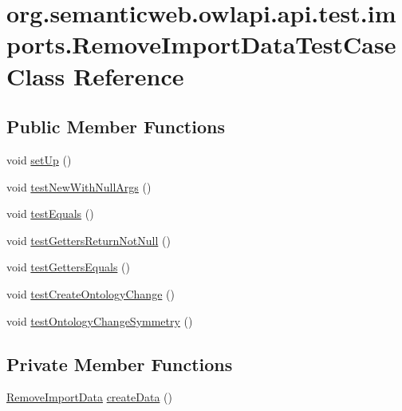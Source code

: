 \hypertarget{classorg_1_1semanticweb_1_1owlapi_1_1api_1_1test_1_1imports_1_1_remove_import_data_test_case}{\section{org.\-semanticweb.\-owlapi.\-api.\-test.\-imports.\-Remove\-Import\-Data\-Test\-Case Class Reference}
\label{classorg_1_1semanticweb_1_1owlapi_1_1api_1_1test_1_1imports_1_1_remove_import_data_test_case}
}
\subsection*{Public Member Functions}
\begin{DoxyCompactItemize}
\item 
void \hyperlink{classorg_1_1semanticweb_1_1owlapi_1_1api_1_1test_1_1imports_1_1_remove_import_data_test_case_acb73a349a7bafdbdde19e4b2c6aa59db}{set\-Up} ()
\item 
void \hyperlink{classorg_1_1semanticweb_1_1owlapi_1_1api_1_1test_1_1imports_1_1_remove_import_data_test_case_acbf6c229004a0d9ea1672f1d2db45bad}{test\-New\-With\-Null\-Args} ()
\item 
void \hyperlink{classorg_1_1semanticweb_1_1owlapi_1_1api_1_1test_1_1imports_1_1_remove_import_data_test_case_a055cbab06be4eba19d0efd63349ac906}{test\-Equals} ()
\item 
void \hyperlink{classorg_1_1semanticweb_1_1owlapi_1_1api_1_1test_1_1imports_1_1_remove_import_data_test_case_af929f17266892b2913c111fe5c7308a6}{test\-Getters\-Return\-Not\-Null} ()
\item 
void \hyperlink{classorg_1_1semanticweb_1_1owlapi_1_1api_1_1test_1_1imports_1_1_remove_import_data_test_case_af0d2131977f14fcfe3fd3cfcc969cbf6}{test\-Getters\-Equals} ()
\item 
void \hyperlink{classorg_1_1semanticweb_1_1owlapi_1_1api_1_1test_1_1imports_1_1_remove_import_data_test_case_a7b3288c786d9079248cb40ea32d9700c}{test\-Create\-Ontology\-Change} ()
\item 
void \hyperlink{classorg_1_1semanticweb_1_1owlapi_1_1api_1_1test_1_1imports_1_1_remove_import_data_test_case_a7a89d72da97f7626791f5451366e8802}{test\-Ontology\-Change\-Symmetry} ()
\end{DoxyCompactItemize}
\subsection*{Private Member Functions}
\begin{DoxyCompactItemize}
\item 
\hyperlink{classorg_1_1semanticweb_1_1owlapi_1_1change_1_1_remove_import_data}{Remove\-Import\-Data} \hyperlink{classorg_1_1semanticweb_1_1owlapi_1_1api_1_1test_1_1imports_1_1_remove_import_data_test_case_a79809734664dc00d25f62e25a1303550}{create\-Data} ()
\end{DoxyCompactItemize}
